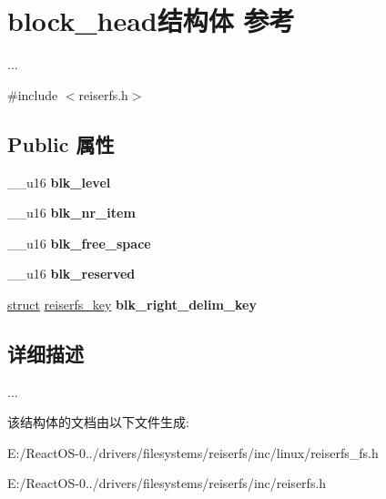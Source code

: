 \hypertarget{structblock__head}{}\section{block\+\_\+head结构体 参考}
\label{structblock__head}


...  




{\ttfamily \#include $<$reiserfs.\+h$>$}

\subsection*{Public 属性}
\begin{DoxyCompactItemize}
\item 
\mbox{\label{structblock__head_a7ddb71af10f53deaf80b43bac742fd91}} 
\+\_\+\+\_\+u16 {\bfseries blk\+\_\+level}
\item 
\mbox{\label{structblock__head_aec83cc4eecf665cb69479be6e34c2ecd}} 
\+\_\+\+\_\+u16 {\bfseries blk\+\_\+nr\+\_\+item}
\item 
\mbox{\label{structblock__head_a2b77271e894956d41afb6899291cb1c3}} 
\+\_\+\+\_\+u16 {\bfseries blk\+\_\+free\+\_\+space}
\item 
\mbox{\label{structblock__head_ac8b21cd39c045f30a5af4f9ea0582586}} 
\+\_\+\+\_\+u16 {\bfseries blk\+\_\+reserved}
\item 
\mbox{\label{structblock__head_a2a5a600dd766e865eb33e367b7bb5c99}} 
\hyperlink{interfacestruct}{struct} \hyperlink{structreiserfs__key}{reiserfs\+\_\+key} {\bfseries blk\+\_\+right\+\_\+delim\+\_\+key}
\end{DoxyCompactItemize}


\subsection{详细描述}
... 

该结构体的文档由以下文件生成\+:\begin{DoxyCompactItemize}
\item 
E\+:/\+React\+O\+S-\/0../drivers/filesystems/reiserfs/inc/linux/reiserfs\+\_\+fs.\+h\item 
E\+:/\+React\+O\+S-\/0../drivers/filesystems/reiserfs/inc/reiserfs.\+h\end{DoxyCompactItemize}
